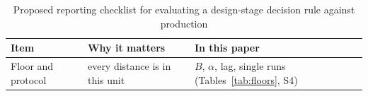 \documentclass[pdflatex,sn-basic,lineno]{sn-jnl}
\newcommand{\tabsize}{\fontsize{8}{9.5}\selectfont}
\providecommand{\DIFaddbeginFL}{} %
\providecommand{\DIFdelbeginFL}{} %
\providecommand{\DIFdelendFL}{} %
\newcommand{\DIFscaledelfig}{0.5}
\newlength{\DIFdelgraphicswidth} %
\newlength{\DIFdelgraphicsheight} %
\newcommand{\DIFaddincludegraphics}[2][]{{\color{blue}\fbox{\DIFOincludegraphics[#1]{#2}}}} %
\newcommand{\DIFdelincludegraphics}[2][]{%
\sbox{\DIFdelgraphicsbox}{\DIFOincludegraphics[#1]{#2}}%
\settoboxwidth{\DIFdelgraphicswidth}{\DIFdelgraphicsbox} %
\settoboxtotalheight{\DIFdelgraphicsheight}{\DIFdelgraphicsbox} %
\scalebox{\DIFscaledelfig}{%
\parbox[b]{\DIFdelgraphicswidth}{\usebox{\DIFdelgraphicsbox}\\[-\baselineskip] \rule{\DIFdelgraphicswidth}{0em}}\llap{\resizebox{\DIFdelgraphicswidth}{\DIFdelgraphicsheight}{%
\setlength{\unitlength}{\DIFdelgraphicswidth}%
\begin{picture}(1,1)%
\thicklines\linethickness{2pt} %
{\color[rgb]{1,0,0}\put(0,0){\framebox(1,1){}}}%
{\color[rgb]{1,0,0}\put(0,0){\line( 1,1){1}}}%
{\color[rgb]{1,0,0}\put(0,1){\line(1,-1){1}}}%
\end{picture}%
}\hspace*{3pt}}} %
} %
\DeclareRobustCommand{\DIFaddbeginFL}{\DIFOaddbeginFL \let\includegraphics\DIFaddincludegraphics} %
\DeclareRobustCommand{\DIFdelbeginFL}{\DIFOdelbeginFL \let\includegraphics\DIFdelincludegraphics} %
\DeclareRobustCommand{\DIFdelendFL}{\DIFOaddendFL \let\includegraphics\DIFOincludegraphics} %
\begin{document}
\begin{table}[t]
\tabsize
\setlength{\tabcolsep}{3pt}
\caption{Proposed reporting checklist for evaluating a design-stage decision rule against production}\label{tab:checklist}
\DIFdelbeginFL %
\DIFdelendFL \DIFaddbeginFL \begin{tabular}{@{}L{2.7cm}L{4.7cm}L{5.0cm}@{}}
\toprule
Item & Why it matters & In this paper \\
\midrule
Floor and protocol & every distance is in this unit & $B$, $\alpha$, lag, single runs (Tables~\ref{tab:floors}, S4) \\

\end{tabular}
\end{table}
\end{document}
